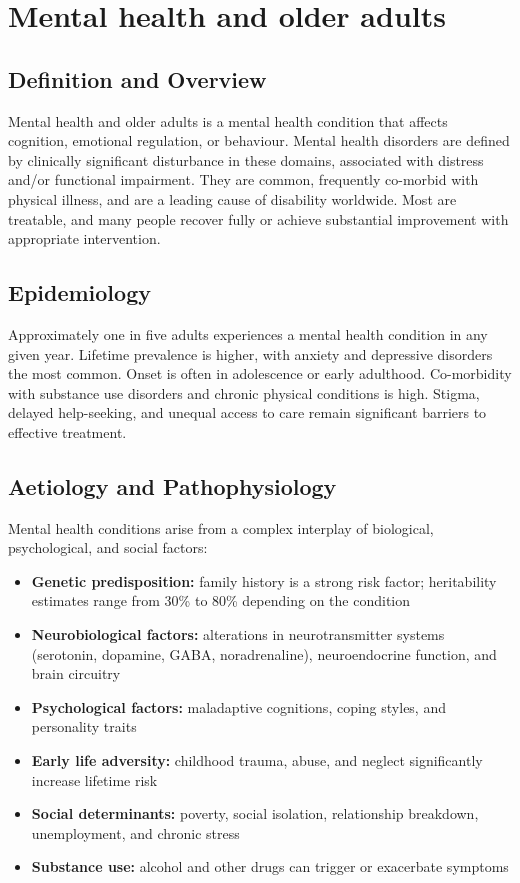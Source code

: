 \chapter{Mental health and older adults}

\section*{Definition and Overview}
Mental health and older adults is a mental health condition that affects cognition, emotional regulation, or behaviour. Mental health disorders are defined by clinically significant disturbance in these domains, associated with distress and/or functional impairment. They are common, frequently co-morbid with physical illness, and are a leading cause of disability worldwide. Most are treatable, and many people recover fully or achieve substantial improvement with appropriate intervention.

\section*{Epidemiology}
Approximately one in five adults experiences a mental health condition in any given year. Lifetime prevalence is higher, with anxiety and depressive disorders the most common. Onset is often in adolescence or early adulthood. Co-morbidity with substance use disorders and chronic physical conditions is high. Stigma, delayed help-seeking, and unequal access to care remain significant barriers to effective treatment.

\section*{Aetiology and Pathophysiology}
Mental health conditions arise from a complex interplay of biological, psychological, and social factors:

\begin{itemize}
    \item \textbf{Genetic predisposition:} family history is a strong risk factor; heritability estimates range from 30\% to 80\% depending on the condition
    \item \textbf{Neurobiological factors:} alterations in neurotransmitter systems (serotonin, dopamine, GABA, noradrenaline), neuroendocrine function, and brain circuitry
    \item \textbf{Psychological factors:} maladaptive cognitions, coping styles, and personality traits
    \item \textbf{Early life adversity:} childhood trauma, abuse, and neglect significantly increase lifetime risk
    \item \textbf{Social determinants:} poverty, social isolation, relationship breakdown, unemployment, and chronic stress
    \item \textbf{Substance use:} alcohol and other drugs can trigger or exacerbate symptoms
\end{itemize}

